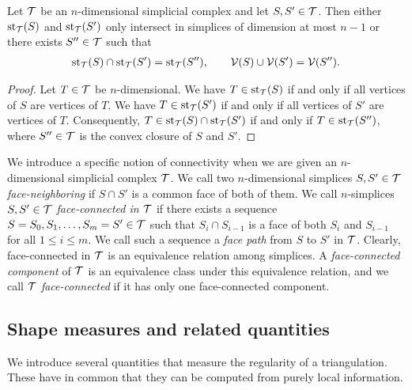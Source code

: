 \documentclass[10pt,a4paper]{article}
\begin{document}
\begin{lemma}
 Let ${\mathcal T}$ be an $n$-dimensional simplicial complex and let $S,S' \in {\mathcal T}$.
 Then either $\operatorname{st}_{{\mathcal T}}(S)$ and $\operatorname{st}_{{\mathcal T}}(S')$ 
 only intersect in simplices of dimension at most $n-1$ %
 or there exists $S'' \in {\mathcal T}$
 such that 
 \begin{align*}
    \operatorname{st}_{{\mathcal T}}(S) \cap \operatorname{st}_{{\mathcal T}}(S') = \operatorname{st}_{{\mathcal T}}(S''),
    \qquad 
    {\mathcal V}(S) \cup {\mathcal V}(S') = {\mathcal V}(S'').
 \end{align*}
\end{lemma}
\begin{proof}
 Let $T \in {\mathcal T}$ be $n$-dimensional.
 We have $T \in \operatorname{st}_{{\mathcal T}}(S )$ if and only if all vertices of $S $ are vertices of $T$.
 We have $T \in \operatorname{st}_{{\mathcal T}}(S')$ if and only if all vertices of $S'$ are vertices of $T$.
 Consequently, $T \in \operatorname{st}_{{\mathcal T}}(S) \cap \operatorname{st}_{{\mathcal T}}(S')$ if and only if $T \in \operatorname{st}_{{\mathcal T}}(S'')$,
 where $S'' \in {\mathcal T}$ is the convex closure of $S$ and $S'$.
\end{proof}

We introduce a specific notion of connectivity when we are given an $n$-dimensional simplicial complex ${\mathcal T}$. 
We call two $n$-dimensional simplices $S, S' \in {\mathcal T}$ \emph{face-neighboring} if $S \cap S'$ is a common face of both of them. 
We call $n$-simplices $S,S' \in {\mathcal T}$ \emph{face-connected in ${\mathcal T}$} if there exists a sequence $S=S_0,S_1,\dots,S_m=S' \in {\mathcal T}$ such that $S_{i} \cap S_{i-1}$ is a face of both $S_{i}$ and $S_{i-1}$ for all $1 \leq i \leq m$. 
We call such a sequence a \emph{face path} from $S$ to $S'$ in ${\mathcal T}$. 
Clearly, face-connected in ${\mathcal T}$ is an equivalence relation among simplices. 
A \emph{face-connected component} of ${\mathcal T}$ is an equivalence class under this equivalence relation, 
and we call ${\mathcal T}$ \emph{face-connected} if it has only one face-connected component. 


\subsection{Shape measures and related quantities}

We introduce several quantities that measure the regularity of a triangulation. 
These have in common that they can be computed from purely local information. 
\end{document}
